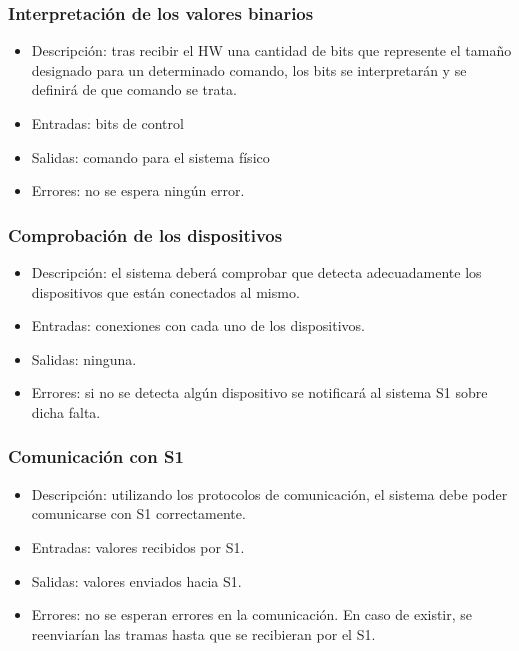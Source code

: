 \subsubsection{Interpretación de los valores binarios}
\begin{itemize}
    \item Descripción: tras recibir el \ac{HW} una cantidad de bits que represente el tamaño designado para un determinado comando, los bits se interpretarán y se definirá de que comando se trata.
    \item Entradas: bits de control
    \item Salidas: comando para el sistema físico
    \item Errores: no se espera ningún error.
\end{itemize}

\subsubsection{Comprobación de los dispositivos}
\begin{itemize}
    \item Descripción: el sistema deberá comprobar que detecta adecuadamente los dispositivos que están conectados al mismo.
    \item Entradas: conexiones con cada uno de los dispositivos.
    \item Salidas: ninguna.
    \item Errores: si no se detecta algún dispositivo se notificará al sistema \ac{S1} sobre dicha falta.
\end{itemize}

\subsubsection{Comunicación con \ac{S1}}
\begin{itemize}
    \item Descripción: utilizando los protocolos de comunicación, el sistema debe poder comunicarse con \ac{S1} correctamente.
    \item Entradas: valores recibidos por \ac{S1}.
    \item Salidas: valores enviados hacia \ac{S1}.
    \item Errores: no se esperan errores en la comunicación. En caso de existir, se reenviarían las tramas hasta que se recibieran por el \ac{S1}.
\end{itemize}

